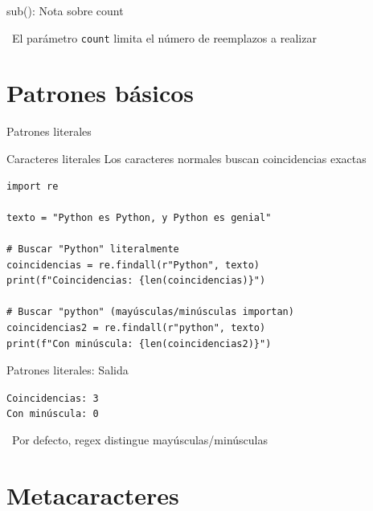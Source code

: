 \documentclass{beamer}
\begin{document}
\begin{frame}{sub(): Nota sobre count \faLightbulb}
\begin{notebox}
\small\faLightbulb\ El parámetro \texttt{count} limita el número de reemplazos a realizar
\end{notebox}
\end{frame}

\section{Patrones básicos}

\begin{frame}[fragile]{Patrones literales \faFont}
\begin{conceptbox}{Caracteres literales}
Los caracteres normales buscan coincidencias exactas
\end{conceptbox}

\begin{lstlisting}
import re

texto = "Python es Python, y Python es genial"

# Buscar "Python" literalmente
coincidencias = re.findall(r"Python", texto)
print(f"Coincidencias: {len(coincidencias)}")

# Buscar "python" (mayúsculas/minúsculas importan)
coincidencias2 = re.findall(r"python", texto)
print(f"Con minúscula: {len(coincidencias2)}")
\end{lstlisting}
\end{frame}

\begin{frame}[fragile]{Patrones literales: Salida \faArrowCircleRight}
\begin{tcolorbox}[colback=green!10,colframe=green,title={\small\faArrowCircleRight \ Salida},coltitle=fg0,left=3pt,right=3pt,top=3pt,bottom=3pt,boxsep=2pt]
\small\texttt{Coincidencias: 3\\
Con minúscula: 0}
\end{tcolorbox}

\vspace{0.3cm}
\begin{notebox}
\small\faExclamationTriangle\ Por defecto, regex distingue mayúsculas/minúsculas
\end{notebox}
\end{frame}

\section{Metacaracteres}
\end{document}
